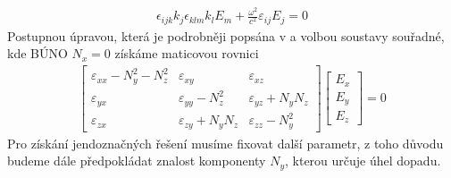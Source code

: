 \begin{eqnarray}
\epsilon_{ijk}k_j\epsilon_{klm}k_lE_m+\frac{\omega^2}{c^2}\varepsilon_{ij}E_j =0
\end{eqnarray}
Postupnou úpravou, která je podrobněji popsána v \cite{Nyvlt} a volbou soustavy souřadné, kde BÚNO $N_x=0$ získáme maticovou rovnici
\begin{eqnarray}
\begin{bmatrix}
\varepsilon_{xx}-N_y^2-N_z^2& \varepsilon_{xy}& \varepsilon_{xz} \\
\varepsilon_{yx}&   \varepsilon_{yy}-N_z^2& \varepsilon_{yz}+N_yN_z\\
\varepsilon_{zx}&   \varepsilon_{zy}+N_yN_z& \varepsilon_{zz}-N_y^2
\end{bmatrix}
\begin{bmatrix}
E_x\\ E_y\\ E_z
\end{bmatrix} = 0
\label{Matic1}
\end{eqnarray}
Pro získání jendoznačných řešení musíme fixovat další parametr, z toho důvodu budeme dále předpokládat znalost komponenty $N_y$, kterou určuje úhel dopadu.

